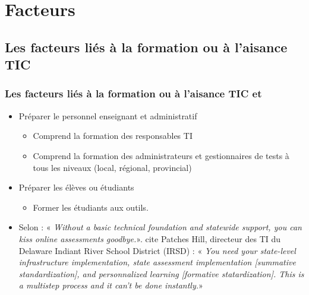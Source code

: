\documentclass[aspectratio=169]{beamer}
\begin{document}
	\section{Facteurs} 
		
		\subsection{Les facteurs liés à la formation ou à l'aisance TIC} 
			\begin{frame}[allowframebreaks]
			 	\frametitle{Les facteurs liés à la formation ou à l'aisance TIC \citep{NorthCarolina2013} et \citep{Lamontagne2013}}
				\begin {itemize}
					\item Préparer le personnel enseignant et administratif
						\begin {itemize}
							\item Comprend la formation des responsables TI
							\item Comprend la formation des administrateurs et gestionnaires de tests à tous les niveaux (local, régional, provincial)
						\end{itemize}	
					\item Préparer les élèves ou étudiants
						\begin {itemize}
							\item Former les étudiants aux outils.
						\end{itemize}
					\item Selon \citet{Stansbury2013A} : « \textit{Without a basic technical foundation and statewide support, you can kiss online assessments goodbye.}». \citet{Stansbury2013A} cite Patches Hill, directeur des TI du Delaware Indiant River School District (IRSD) : « \textit{You need your state-level infrastructure implementation, state assessment implementation [summative standardization], and personnalized learning [formative statardization]. This is a multistep process and it can't be done instantly.}»
					
				\end{itemize}
			\end{frame}
			
\end{document}

